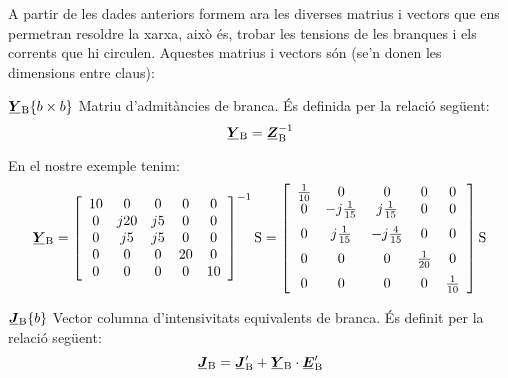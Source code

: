A partir de les dades anteriors formem ara les diverses matrius i
vectors que ens permetran resoldre la xarxa, això és, trobar les
tensions de les branques i els corrents que hi circulen. Aquestes
matrius i vectors són (se'n donen les dimensions entre claus):

\begin{list}{}
{\setlength{\labelwidth}{20mm} \setlength{\leftmargin}{22mm} \setlength{\labelsep}{2mm}}
   \item[$\mcmplx{Y}\ped{B}\{b\times b\}$] Matriu d'admitàncies de branca. És definida per la relació següent:
   \begin{equation}
      \mcmplx{Y}\ped{B} = \mcmplx{Z}\ped{B}^{-1}
   \end{equation}

   En el nostre exemple tenim:
   \[
      \mcmplx{Y}\ped{B} = 
      \begin{bmatrix}\begin{array}{ccccc} 
            10 & 0 & 0 & 0 & 0 \\
            0 & j 20 & j 5 & 0 & 0 \\
            0 & j 5 & j 5 & 0 & 0 \\
            0 & 0 & 0 & 20 & 0 \\
            0 & 0 & 0 & 0 & 10
      \end{array}\end{bmatrix}^{-1}\unit{S} =
      \begin{bmatrix}\begin{array}{ccccc} 
            \frac{1}{10} & 0 & 0 & 0 & 0 \\
            0 & -j\frac{1}{15} & j\frac{1}{15} & 0 & 0 \\[2mm]
            0 & j\frac{1}{15} & -j\frac{4}{15} & 0 & 0 \\[2mm]
            0 & 0 & 0 & \frac{1}{20} & 0 \\[2mm]
            0 & 0 & 0 & 0 & \frac{1}{10}
      \end{array}\end{bmatrix}\unit{S}
   \]

   \item[$\mcmplx{J}\ped{B}\{b\}$] Vector columna d'intensivitats  equivalents de branca. És definit per la relació següent:
   \begin{equation}
      \mcmplx{J}\ped{B} = \mcmplx{J}'\ped{B}  + \mcmplx{Y}\ped{B} \cdot\mcmplx{E}'\ped{B}
   \end{equation}


\end{list}
